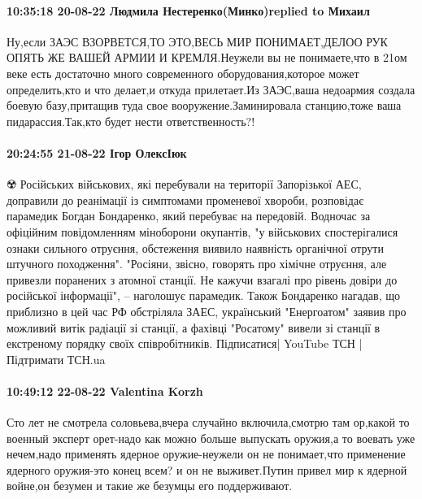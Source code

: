  
 
 
 
 

\paragraph{10:35:18 20-08-22 Людмила Нестеренко(Минко)replied to Михаил}

Ну,если ЗАЭС ВЗОРВЕТСЯ,ТО ЭТО,ВЕСЬ МИР ПОНИМАЕТ,ДЕЛОО РУК ОПЯТЬ ЖЕ ВАШЕЙ АРМИИ
И КРЕМЛЯ.Неужели вы не понимаете,что в 21ом веке есть достаточно много
современного оборудования,которое может определить,кто и что делает,и откуда
прилетает.Из ЗАЭС,ваша недоармия создала боевую базу,притащив туда свое
вооружение.Заминировала станцию,тоже ваша пидарассия.Так,кто будет нести
ответственность?!

\paragraph{20:24:55 21-08-22 Ігор ОлексІюк}

☢️ Російських військових, які перебували на території Запорізької АЕС, доправили до реанімації із симптомами променевої хвороби, розповідає парамедик Богдан Бондаренко, який перебуває на передовій. Водночас за офіційним повідомленням міноборони окупантів, "у військових спостерігалися ознаки сильного отруєння, обстеження виявило наявність органічної отрути штучного походження".
"Росіяни, звісно, говорять про хімічне отруєння, але привезли поранених з атомної станції. Не кажучи взагалі про рівень довіри до російської інформації", – наголошує парамедик. Також Бондаренко нагадав, що приблизно в цей час РФ обстріляла ЗАЕС, український "Енергоатом" заявив про можливий витік радіації зі станції, а фахівці "Росатому" вивели зі станції в екстреному порядку своїх співробітників.
Підписатися| YouTube ТСН | Підтримати ТСН.ua

\paragraph{10:49:12 22-08-22 Valentina Korzh}

Сто лет не смотрела соловьева,вчера случайно включила,смотрю там ор,какой то
военный эксперт орет-надо как можно больше выпускать оружия,а то воевать уже
нечем,надо применять ядерное оружие-неужели он не понимает,что применение
ядерного оружия-это конец всем? и он не выживет.Путин привел мир к ядерной
войне,он безумен и такие же безумцы его поддерживают.
